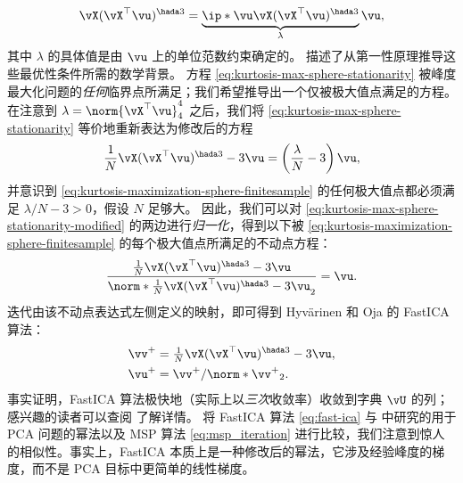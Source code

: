 \documentclass[../../book-main_zh.tex]{subfiles}
\begin{document}
\begin{align}\label{eq:kurtosis-max-sphere-stationarity}
    \vX (\vX^\top \vu)^{\hada 3}
    =
    \underbrace{
        \ip*{\vu}{
            \vX (\vX^\top \vu)^{\hada 3}
    }}_{\lambda} \vu,
\end{align}
其中 $\lambda$ 的具体值是由 $\vu$ 上的单位范数约束确定的。
 描述了从第一性原理推导这些最优性条件所需的数学背景。
方程 \eqref{eq:kurtosis-max-sphere-stationarity}
被峰度最大化问题的\textit{任何}临界点所满足；我们希望推导出一个仅被极大值点满足的方程。
在注意到 $\lambda = \norm{\vX^\top \vu}_4^4$ 之后，我们将
\eqref{eq:kurtosis-max-sphere-stationarity} 等价地重新表达为修改后的方程
\begin{align}\label{eq:kurtosis-max-sphere-stationarity-modified}
    \frac{1}{N}\vX (\vX^\top \vu)^{\hada 3}
    -
    3 \vu
    =
    \left(
        \frac{\lambda}{N} - 3
    \right)
    \vu,
\end{align}
并意识到 \eqref{eq:kurtosis-maximization-sphere-finitesample}
的任何极大值点都必须满足 $\lambda / N - 3 > 0$，假设 $N$ 足够大。
因此，我们可以对 \eqref{eq:kurtosis-max-sphere-stationarity-modified}
的两边进行\textit{归一化}，得到以下被
\eqref{eq:kurtosis-maximization-sphere-finitesample} 的每个极大值点所满足的不动点方程：
\begin{align}\label{eq:kurtosis-max-sphere-fxp}
    \frac{
        \frac{1}{N}\vX (\vX^\top \vu)^{\hada 3}
        -
        3 \vu
    }{
        \norm*{
            \frac{1}{N}\vX (\vX^\top \vu)^{\hada 3}
            -
            3 \vu
        }_2
    }
    =
    \vu.
\end{align}
迭代由该不动点表达式左侧定义的映射，即可得到 Hyv\"{a}rinen 和 Oja \cite{hyvarinen-1997} 的 FastICA 算法：
\begin{equation}
    \begin{split}\label{eq:fast-ica}
        \vv^+ &= \tfrac{1}{N}\vX (\vX^\top \vu)^{\hada 3}- 3 \vu
        ,  \\
        \vu^+ &= \vv^+ / \norm*{\vv^+}_2.
    \end{split}
\end{equation}
事实证明，FastICA 算法极快地（实际上以\textit{三次}收敛率）收敛到字典 $\vU$ 的列；感兴趣的读者可以查阅
\cite{hyvarinen-1997} 了解详情。
将 FastICA 算法 \eqref{eq:fast-ica} 与  中研究的用于 PCA 问题的幂法以及
MSP 算法 \eqref{eq:msp_iteration} 进行比较，我们注意到惊人的相似性。事实上，FastICA
本质上是一种修改后的幂法，它涉及经验峰度的梯度，而不是 PCA 目标中更简单的线性梯度。
\end{document}
